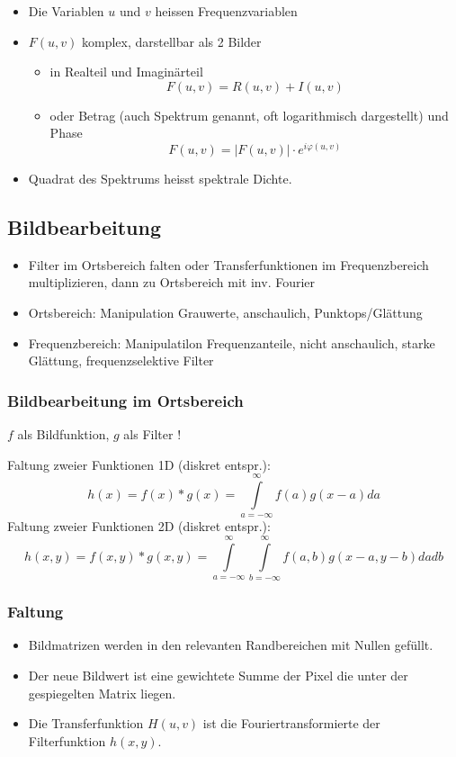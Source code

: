 \begin{itemize}
\item Die Variablen $u$ und $v$ heissen Frequenzvariablen
\item $F(u,v)$ komplex, darstellbar als 2 Bilder
\begin{itemize}
\item in Realteil und Imaginärteil $$F(u,v) = R(u,v) + I(u,v)$$
\item oder Betrag (auch Spektrum genannt, oft logarithmisch dargestellt) und Phase $$F(u,v) = |F(u,v)| \cdot e^{i \varphi (u,v)}$$
\end{itemize}
\item Quadrat des Spektrums heisst spektrale Dichte.
\end{itemize}

\subsection{Bildbearbeitung}

\begin{itemize}
\item Filter im Ortsbereich falten oder Transferfunktionen im Frequenzbereich multiplizieren, dann zu Ortsbereich mit inv. Fourier
\item Ortsbereich: Manipulation Grauwerte, anschaulich, Punktops/Glättung
\item Frequenzbereich: Manipulatilon Frequenzanteile, nicht anschaulich, starke Glättung, frequenzselektive Filter
\end{itemize}

\subsubsection*{Bildbearbeitung im Ortsbereich}

$f$ als Bildfunktion, $g$ als Filter !

Faltung zweier Funktionen 1D (diskret entspr.): $$h(x) = f(x) * g(x) = \int\limits_{a = - \infty}^{\infty} f(a) g(x-a) da$$
Faltung zweier Funktionen 2D (diskret entspr.): $$h(x,y) = f(x,y) * g(x,y) = \int\limits_{a = -\infty}^{\infty} \int\limits_{b = -\infty}^{\infty} f(a,b) g(x-a,y-b) dadb$$

\subsubsection*{Faltung}

\begin{itemize}
\item Bildmatrizen werden in den relevanten Randbereichen mit Nullen gefüllt.
\item Der neue Bildwert ist eine gewichtete Summe der Pixel die unter der gespiegelten Matrix liegen.
\item Die Transferfunktion $H(u,v)$ ist die Fouriertransformierte der Filterfunktion $h(x,y)$.
\end{itemize}

